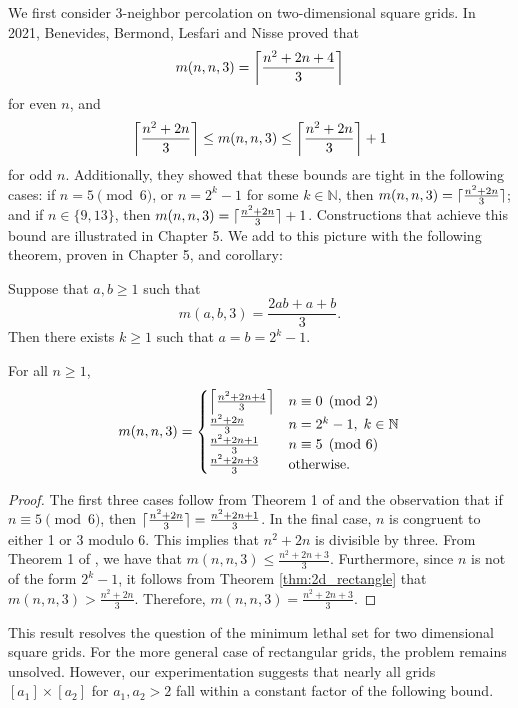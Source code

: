 We first consider 3-neighbor percolation on two-dimensional square grids. In 2021, Benevides, Bermond, Lesfari and Nisse proved that 
$$m(n,n,3) = \ceil*{\frac{n^2+2n+4}{3}}$$
for even $n$, and 
$$\ceil*{\frac{n^2+2n}{3}} \leq m(n,n,3) \leq \ceil*{\frac{n^2+2n}{3}} + 1$$
for odd $n$. Additionally, they showed that these bounds are tight in the following cases: if $n = 5 \pmod 6$, or $n = 2^k - 1$ for some $k \in \mathbb{N}$, then $m(n,n,3) = \ceil{\frac{n^2+2n}{3}}$; and if $n \in \{9,13\}$, then $m(n,n,3) = \ceil{\frac{n^2+2n}{3}} + 1$. Constructions that achieve this bound are illustrated in Chapter 5. We add to this picture with the following theorem, proven in Chapter 5, and corollary:

\begin{thm}
\label{thm:2d_rectangle}
Suppose that $a, b \geq 1$ such that
$$m(a,b,3) = \frac{2ab+a+b}{3}.$$
Then there exists $k \geq 1$ such that $a=b=2^k-1$.
\end{thm}

\begin{cor}
\label{cor:square_grids_thickness_1}
For all $n \geq 1$,
$$ m(n,n,3) =
\begin{cases} 
      \ceil*{\frac{n^2+2n+4}{3}} & n \equiv 0 \pmod 2 \\
      \frac{n^2+2n}{3} & n = 2^k-1, \; k \in \mathbb{N} \\
      \frac{n^2+2n+1}{3} & n \equiv 5 \pmod 6 \\
      \frac{n^2+2n+3}{3} & \text{otherwise.}
   \end{cases}
$$
\end{cor}

\begin{proof}
The first three cases follow from Theorem 1 of \cite{benevides:2021} and the observation that if $n \equiv 5 \pmod 6$, then $\ceil{\frac{n^2+2n}{3}} = \frac{n^2+2n+1}{3}$. In the final case, $n$ is congruent to either 1 or 3 modulo 6. This implies that $n^2 + 2n$ is divisible by three. From Theorem 1 of \cite{benevides:2021}, we have that $m(n,n,3) \leq \frac{n^2+2n+3}{3}$. Furthermore, since $n$ is not of the form $2^k-1$, it follows from Theorem \ref{thm:2d_rectangle} that $m(n,n,3) > \frac{n^2+2n}{3}$. Therefore, $m(n,n,3) = \frac{n^2+2n+3}{3}$.
\end{proof}

This result resolves the question of the minimum lethal set for two dimensional square grids. For the more general case of rectangular grids, the problem remains unsolved. However, our experimentation suggests that nearly all grids $[a_1] \times [a_2]$ for $a_1,a_2 > 2$ fall within a constant factor of the following bound.

